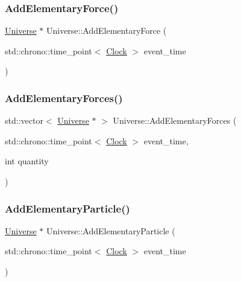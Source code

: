 \subsubsection{\texorpdfstring{Add\+Elementary\+Force()}{AddElementaryForce()}}
{\footnotesize\ttfamily \mbox{\hyperlink{classUniverse}{Universe}} $\ast$ Universe\+::\+Add\+Elementary\+Force (\begin{DoxyParamCaption}\item[{std\+::chrono\+::time\+\_\+point$<$ \mbox{\hyperlink{universe_8h_a0ef8d951d1ca5ab3cfaf7ab4c7a6fd80}{Clock}} $>$}]{event\+\_\+time }\end{DoxyParamCaption})}

\mbox{\label{classUniverse_a81d294300346e9f901836ab609cce942}} 
\subsubsection{\texorpdfstring{Add\+Elementary\+Forces()}{AddElementaryForces()}}
{\footnotesize\ttfamily std\+::vector$<$ \mbox{\hyperlink{classUniverse}{Universe}} $\ast$ $>$ Universe\+::\+Add\+Elementary\+Forces (\begin{DoxyParamCaption}\item[{std\+::chrono\+::time\+\_\+point$<$ \mbox{\hyperlink{universe_8h_a0ef8d951d1ca5ab3cfaf7ab4c7a6fd80}{Clock}} $>$}]{event\+\_\+time,  }\item[{int}]{quantity }\end{DoxyParamCaption})}

\mbox{\label{classUniverse_ab9c84e0576de50aa4fa46655832ce5e4}} 
\subsubsection{\texorpdfstring{Add\+Elementary\+Particle()}{AddElementaryParticle()}}
{\footnotesize\ttfamily \mbox{\hyperlink{classUniverse}{Universe}} $\ast$ Universe\+::\+Add\+Elementary\+Particle (\begin{DoxyParamCaption}\item[{std\+::chrono\+::time\+\_\+point$<$ \mbox{\hyperlink{universe_8h_a0ef8d951d1ca5ab3cfaf7ab4c7a6fd80}{Clock}} $>$}]{event\+\_\+time }\end{DoxyParamCaption})}

